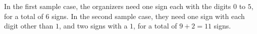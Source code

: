 \begin{afterSample}

  In the first sample case, the organizers need one sign each with the digits $0$ to $5$, for a total of $6$ signs.
  In the second sample case, they need one sign with each digit other than $1$, and two signs with a $1$, for a total of $9+2=11$ signs.
\end{afterSample}
